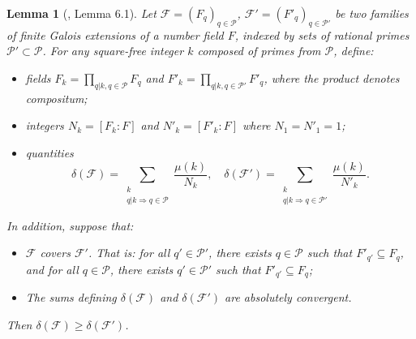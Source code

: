\documentclass{amsart}
\theoremstyle{plain}
\newtheorem{lemma}[theorem]{Lemma}
\theoremstyle{remark}
\begin{document}
\begin{lemma} [\cite{CoMu}, Lemma 6.1] \label{C6.1}
    Let $\mathcal{F}=(F_q)_{q \in \mathcal{P}}$, $\mathcal{F}'=(F'_q)_{q \in \mathcal{P}'}$ be two families of finite Galois extensions of a number field $F$, indexed by sets of rational primes $\mathcal{P}' \subset \mathcal{P}$. For any square-free integer $k$ composed of primes from $\mathcal{P}$, define:
    \begin{itemize}
        \item fields $F_k = \prod_{q|k, q \in \mathcal{P}} F_q$ and  $F'_k = \prod_{q|k,  q \in \mathcal{P}'} F'_q $, where the product denotes compositum;
        \item integers $N_k = [F_k:F]$ and $N'_k = [F'_k:F]$ where $N_1=N'_1=1$;
        \item quantities
        \[\delta(\mathcal{F}) = \sum_{\substack{k \\ q|k \Rightarrow q \in \mathcal{P}}} \frac{\mu(k)}{N_k}, \quad \delta(\mathcal{F}') = \sum_{\substack{k \\ q|k \Rightarrow q \in \mathcal{P}'}} \frac{\mu(k)}{N'_k}.\]
    \end{itemize}
    In addition, suppose that:
    \begin{itemize}
        \item $\mathcal{F}$ \emph{covers} $\mathcal{F}'$. That is: for all $q' \in \mathcal{P}'$, there exists $q \in \mathcal{P}$ such that $F'_{q'} \subseteq F_q$, and for all $q \in \mathcal{P}$, there exists $q' \in \mathcal{P}'$ such that $F'_{q'} \subseteq F_q$;
        \item The sums defining $\delta(\mathcal{F})$ and $\delta(\mathcal{F}')$ are absolutely convergent.
    \end{itemize}
    Then $\delta(\mathcal{F}) \ge \delta(\mathcal{F}')$.
\end{lemma}
\end{document}
